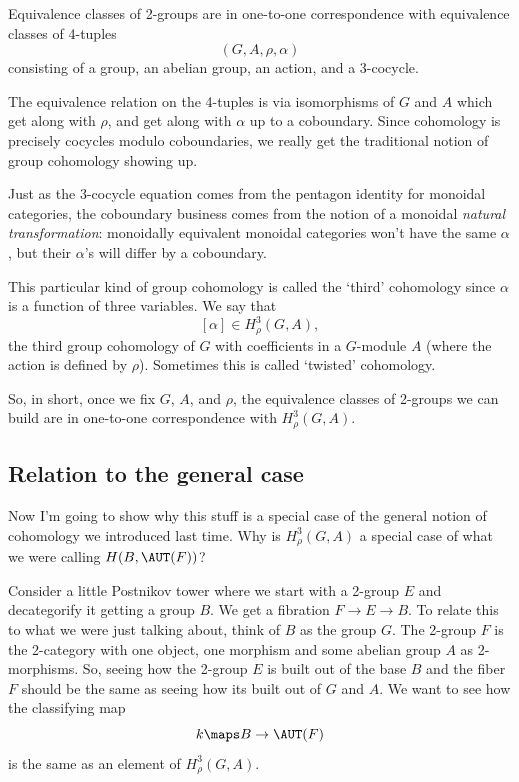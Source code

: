 \documentclass[12pt]{amsart}
\begin{document}
\begin{thm}[Sinh]
  Equivalence classes of 2-groups are in one-to-one correspondence
  with equivalence classes of 4-tuples
  \[(G, A, \rho, \alpha)\]
  consisting of a group, an abelian group, an action, and a 3-cocycle.
\end{thm}

The equivalence relation on the 4-tuples is via isomorphisms of $G$ and
$A$ which get along with $\rho$, and get along with $\alpha$ up to a
coboundary.  Since cohomology is precisely cocycles modulo
coboundaries, we really get the traditional notion of group cohomology
showing up.  

Just as the 3-cocycle equation comes from the pentagon 
identity for monoidal categories, the 
coboundary business comes from the notion of a monoidal \emph{natural 
transformation}: monoidally equivalent monoidal categories won't have 
the same $\alpha$, but their $\alpha$'s will differ by a coboundary.

This particular kind of group cohomology is called the `third'
cohomology since $\alpha$ is a function of three variables.
We say that
\[
[\alpha] \in H^3_\rho(G,A),
\]
the third group cohomology of $G$ with coefficients in a $G$-module
$A$ (where the action is defined by $\rho$).  Sometimes this is called
`twisted' cohomology.  

So, in short, once we fix $G$, $A$, and $\rho$, the equivalence classes 
of 2-groups we can build are in one-to-one correspondence with 
$H^3_\rho(G,A)$. 

\subsection{Relation to the general case}
\label{sec:relat-gener-case}

Now I'm going to show why this stuff is a special case of the general
notion of cohomology we introduced last time.  Why is $H^3_\rho(G,A)$
a special case of what we were calling $H(B,\AUT(F))$?

Consider a little Postnikov tower where we start with a 2-group
$E$ and decategorify it getting a group $B$.  We get a fibration 
$F\to E\to B$.  To relate this to what we were just talking about,
think of $B$ as the group $G$.  The 2-group $F$ is the 2-category with
one object, one morphism and some abelian group $A$ as 2-morphisms.
So, seeing how the 2-group $E$ is built out of the base $B$ and the
fiber $F$ should be the same as seeing how its built out of $G$ and
$A$.  We want to see how the classifying map
\[k\maps B \to \AUT(F)\]
is the same as an element of $H^3_\rho(G,A)$.
\end{document}
